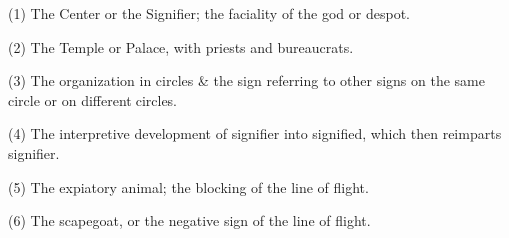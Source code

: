 \documentclass{scrartcl}
\begin{document}
	\vspace{0.25cm}
	
	{\small\hspace{-1.4cm}(1) The Center or the Signifier; the faciality of the god or despot.}
	
	{\small\hspace{-1.4cm}(2) The Temple or Palace, with priests and bureaucrats.}
	
	{\small\hspace{-1.4cm}(3) \hspace{0.03cm}The organization in circles \& the sign referring to other signs on the same circle or on different$\;$circles.}
	
	{\small\hspace{-1.4cm}(4) The interpretive development of signifier into signified, which then reimparts signifier.}
	
	{\small\hspace{-1.4cm}(5) The expiatory animal; the blocking of the line of flight.}
	
	{\small\hspace{-1.4cm}(6) The scapegoat, or the negative sign of the line of flight.}
\end{document}
